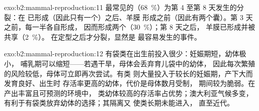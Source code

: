 \begin{solution}{exo:b2:mammal-reproduction:11}
最常见的（\qty{68}{\%}）为第 4 至第 8 天发生的分裂：在
已形成（因此只有一个）之后、羊膜
形成之前（因此有两个囊）。第 3 天之前，每一半各自形成，
因而形成两个（\qty{30}{\%}）；第 8 天之后，
羊膜已形成并被共享（\qty{2}{\%}）。
在定型之后才分裂，显然是
最容易发生的事件。
\end{solution}

\begin{solution}{exo:b2:mammal-reproduction:12}
有袋类在出生前投入很少：妊娠期短，幼体极小，
哺乳期可以缩短——若遇干旱，母体会丢弃育儿袋中的幼体，
因此每次繁殖的风险较低，母体可立即再次尝试。有类
则大量投入于较长的妊娠期，产下大而发育良好、出生时
存活率更高的幼体，代价是母体数月受制，
期间较为脆弱。在产出丰富且可预测的环境中，
类幼体较高的存活率占优势；澳大利亚气候多变，
有利于有袋类放弃幼体的选择；其隔离又
使类长期未能进入，
直至近代。
\end{solution}


